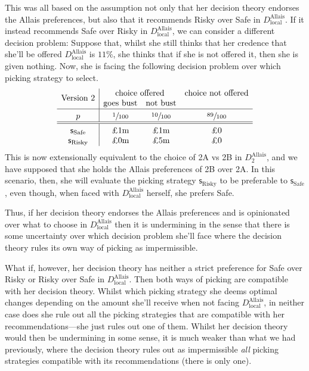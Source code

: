\documentclass[a4paper]{article}
\newcommand\Tstrut{\rule{0pt}{2.6ex}}       %
\newcommand\Bstrut{\rule[-0.9ex]{0pt}{0pt}} %
\newcommand\s{\mathsf{s}}
\newenvironment{CCM rewritten}
{\begingroup\color{blue}} %
{\endgroup}              %
\begin{document}
This was all based on the assumption not only that her decision theory endorses the Allais preferences, but also that it recommends Risky over Safe in $D^{\mathrm{Allais}}_{\mathrm{local}}$. If it instead recommends Safe over Risky in $D^{\mathrm{Allais}}_{\mathrm{local}}$, we can consider a different decision problem: Suppose that, whilst she still thinks that her credence that she'll be offered $D^{\mathrm{Allais}}_{\mathrm{local}}$ is $11\%$, she thinks that if she is not offered it, then she is given nothing. 
Now, she is facing the following decision problem over which picking strategy to select. 
$$
\begin{array}{c|ccc}
	\multirow{2}{*}{\text{Version 2}}	&\multicolumn{2}{c}{\text{choice offered}}&\text{choice not offered}\\
	& \text{goes bust} &  \text{not bust}  \Bstrut \\\hline \Tstrut	p&  \sfrac{1}{100} &  \sfrac{10}{100} &  \sfrac{89}{100} \Bstrut \\\hline \hline\Tstrut 
	\s_{\mathrm{Safe}} & \text{\pounds 1m}&\text{\pounds 1m}         &\text{\pounds 0}               \\
	\s_{\mathrm{Risky}}& \text{\pounds 0m}&\text{\pounds 5m}& \text{\pounds 0}
\end{array}
$$
This is now extensionally equivalent to the choice of 2A vs 2B in $D^{\mathrm{Allais}}_2$, and we have supposed that she holds the Allais preferences of 2B over 2A. In this scenario, then, she will evaluate the picking strategy $\s_{\mathrm{Risky}}$ to be preferable to $\s_{\mathrm{Safe}}$, even though, when faced with  $D^{\mathrm{Allais}}_{\mathrm{local}}$ herself, she prefers Safe. 

Thus, if her decision theory endorses the Allais preferences and is opinionated over what to choose in $D^{\mathrm{Allais}}_{\mathrm{local}}$ then it is undermining in the sense that there is some uncertainty over which decision problem she'll face where the decision theory rules its own way of picking as impermissible. 

What if, however, her decision theory has neither a strict preference for Safe over Risky or Risky over Safe in $D^{\mathrm{Allais}}_{\mathrm{local}}$. Then both ways of picking are compatible with her decision theory. Whilst which picking strategy she deems optimal changes depending on the amount she'll receive when not facing $D^{\mathrm{Allais}}_{\mathrm{local}}$, in neither case does she rule out all the picking strategies that are compatible with her recommendations---she just rules out one of them. Whilst her decision theory would then be undermining in some sense, it is much weaker than what we had previously, where the decision theory rules out as impermissible \textit{all} picking strategies compatible with its recommendations (there is only one).%
\end{document}
